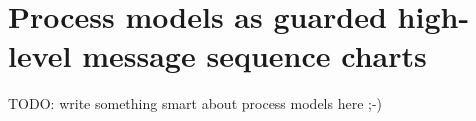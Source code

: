 \section{Process models as guarded high-level message sequence charts\label{section:background-process-models}}

TODO: write something smart about process models here ;-)
